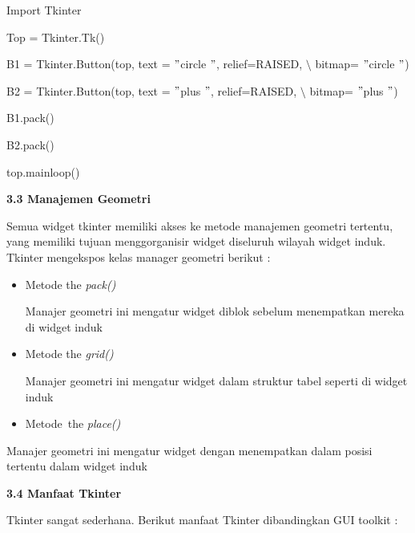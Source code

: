 \documentclass [12pt,a4paper,notitlepage,oneside,bahasa]{article}
\begin{document}
{\fontsize{10pt}{10pt}\selectfont Import Tkinter} \par
\vspace{10pt}
{\fontsize{10pt}{10pt}\selectfont Top = Tkinter.Tk()} \par
\vspace{10pt}
{\fontsize{10pt}{10pt}\selectfont B1 = Tkinter.Button(top, text = $ " $circle $ " $, relief=RAISED,  $  \setminus  $ bitmap= $ " $circle $ " $)} \par
{\fontsize{10pt}{10pt}\selectfont B2 = Tkinter.Button(top, text = $ " $plus $ " $, relief=RAISED,  $  \setminus  $ bitmap= $ " $plus $ " $)} \par
\vspace{10pt}
{\fontsize{10pt}{10pt}\selectfont B1.pack()} \par
{\fontsize{10pt}{10pt}\selectfont B2.pack()} \par
{\fontsize{10pt}{10pt}\selectfont top.mainloop()} \par
\vspace{10pt}
\noindent 
\textbf{3.3 Manajemen Geometri} \par
\noindent 
 \hspace*{0.5in} Semua widget tkinter memiliki akses ke metode manajemen geometri tertentu, yang memiliki tujuan menggorganisir widget diseluruh wilayah widget induk. Tkinter mengekspos kelas manager geometri berikut : \par
\noindent 
\begin{itemize}
\item Metode the \textit{pack()} \par
\noindent 
Manajer geometri ini mengatur widget diblok sebelum menempatkan mereka di widget induk \par
\noindent 
\item Metode the \textit{grid()} \par
\noindent 
Manajer geometri ini mengatur widget dalam struktur tabel seperti di widget induk \par
\noindent 
\item Metode~the  \textit{place()}\end{itemize}
 \par
\noindent 
Manajer geometri ini mengatur widget dengan menempatkan dalam posisi tertentu dalam widget induk \par
\vspace{12pt}
\noindent 
\textbf{3.4 Manfaat Tkinter} \par
Tkinter sangat sederhana. Berikut manfaat Tkinter dibandingkan GUI toolkit : \par
\end{document}
